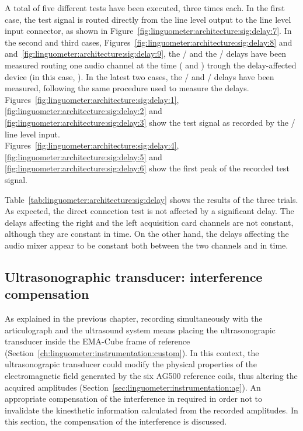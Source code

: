 A total of five different tests have been executed, three times each.
In the first case, the test signal is routed directly from the line level output
to the line level input connector, as shown in
Figure~\ref{fig:linguometer:architecture:sig:delay:7}.
In the second and third cases,
Figures~\ref{fig:linguometer:architecture:sig:delay:8} and
and~\ref{fig:linguometer:architecture:sig:delay:9},
the  / and
the / delays have been measured routing one audio channel
at the time ( and ) trough the delay-affected
device (in this case, ).
In the latest two cases, the  / and 
/ delays have been measured, following the same
procedure used to measure the  delays.
Figures~\ref{fig:linguometer:architecture:sig:delay:1}, 
\ref{fig:linguometer:architecture:sig:delay:2} and
\ref{fig:linguometer:architecture:sig:delay:3} show the test signal 
as recorded by the  / line level input.\\
Figures~\ref{fig:linguometer:architecture:sig:delay:4}, 
\ref{fig:linguometer:architecture:sig:delay:5} and
\ref{fig:linguometer:architecture:sig:delay:6} show the
first peak of the recorded test signal.


Table~\ref{tab:linguometer:architecture:sig:delay} shows the results of the
three trials. As expected, the direct connection test is not affected by a
significant delay. The delays affecting the right and the left acquisition card
channels are not constant, although they are constant in time. 
On the other hand, the delays affecting the audio mixer appear to be constant
both between the two channels and in time.
\subsection{Ultrasonographic transducer: interference compensation}
\label{sec:linguometer:technical:interference}
As explained in the previous chapter, recording simultaneously with the
articulograph and the ultrasound system means placing the ultrasonograpic 
transducer inside the EMA-Cube frame of reference
(Section~\ref{ch:linguometer:instrumentation:custom}).
In this context, the ultrasonograpic transducer could  
modify the physical properties of the electromagnetic field generated by the six
AG500 reference coils, thus altering the acquired amplitudes
(Section~\ref{sec:linguometer:instrumentation:ag}).
An appropriate compensation of the interference in required in order not to
invalidate the kinesthetic information calculated from the recorded amplitudes.
In this section, the compensation of the interference is discussed.

